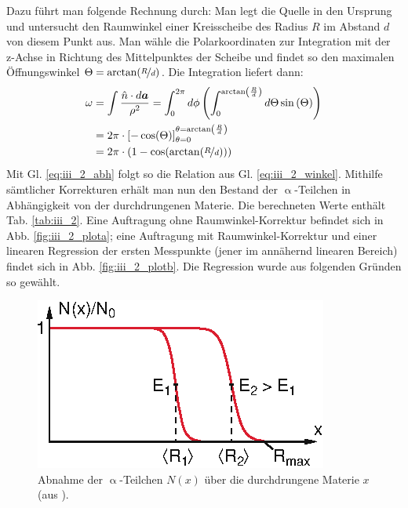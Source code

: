 Dazu führt man folgende Rechnung durch: Man legt die Quelle in den Ursprung und untersucht den Raumwinkel einer Kreisscheibe des Radius $R$ im Abstand $d$ von diesem Punkt aus. Man wähle die Polarkoordinaten zur Integration mit der z-Achse in Richtung des Mittelpunktes der Scheibe und findet so den maximalen Öffnungswinkel $\Theta = \arctan(\nicefrac{R}{d})$. Die Integration liefert dann:
\begin{align}
\omega &= \int \frac{\hat{n}\cdot d\vec{a}}{\rho^2} = \int_0^{2 \pi} d\phi \left( \int_0^{\arctan\left(\frac{R}{d}\right)} d\Theta \sin\left(\Theta\right) \right)\nonumber\\
&= 2\pi \cdot \left[ -\cos(\Theta) \right]_{\theta=0}^{\theta=\arctan\left(\frac{R}{d}\right)}\nonumber\\
&= 2\pi \cdot (1-\cos(\arctan(\nicefrac{R}{d})))
\end{align}
Mit Gl. \eqref{eq:iii_2_abh} folgt so die Relation aus Gl. \eqref{eq:iii_2_winkel}. Mithilfe sämtlicher Korrekturen erhält man nun den Bestand der $\upalpha$-Teilchen in Abhängigkeit von der durchdrungenen Materie. Die berechneten Werte enthält Tab. \ref{tab:iii_2}. Eine Auftragung ohne Raumwinkel-Korrektur befindet sich in Abb. \ref{fig:iii_2_plota}; eine Auftragung mit Raumwinkel-Korrektur und einer linearen Regression der ersten Messpunkte (jener im annähernd linearen Bereich) findet sich in Abb. \ref{fig:iii_2_plotb}. Die Regression wurde aus folgenden Gründen so gewählt.

\begin{figure}[tb]
\centering
\includegraphics[scale=1.5]{fig/iii_2_dem.eps}
\caption{Abnahme der $\upalpha$-Teilchen $N(x)$ über die durchdrungene Materie $x$ (aus \cite[S. 90]{Dem10}).}
\label{fig:iii_2_dem}
\end{figure}

